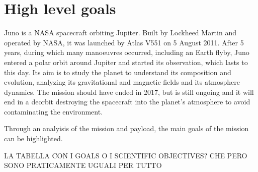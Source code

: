 \section{High level goals}
\label{sec:goals}

Juno is a NASA spacecraft orbiting Jupiter. Built by Lockheed Martin and operated by NASA, it was launched by Atlas V551 on 5 August 2011. After 5 years, during which many manoeuvres occurred, including an Earth flyby, Juno entered a polar orbit around Jupiter and started its observation, which lasts to this day. Its aim is to study the planet to understand its composition and evolution, analyzing its gravitational and magnetic fields and its atmosphere dynamics. The mission should have ended in 2017, but is still ongoing and it will end in a deorbit destroying the spacecraft into the planet's atmosphere to avoid contaminating the environment. 


Through an analyisis of the mission and payload, the main goals of the mission can be highlighted.


LA TABELLA CON I GOALS O I SCIENTIFIC OBJECTIVES? CHE PERO SONO PRATICAMENTE UGUALI PER TUTTO

